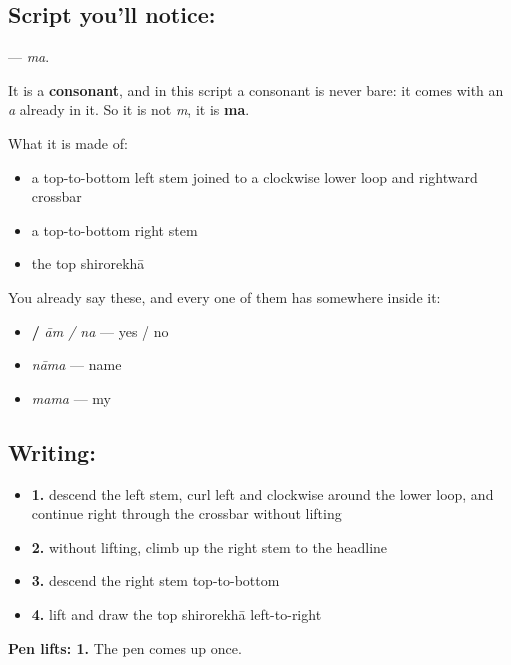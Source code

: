\subsection*{Script you'll notice: }
\textbf{} — \emph{ma}.

It is a \textbf{consonant}, and in this script a consonant is never bare: it comes with an \emph{a} already in it. So it is not \emph{m}, it is \textbf{ma}.

What it is made of:

\begin{itemize}
\raggedright
  \item a top-to-bottom left stem joined to a clockwise lower loop and rightward crossbar
  \item a top-to-bottom right stem
  \item the top shirorekhā
\end{itemize}

You already say these, and every one of them has  somewhere inside it:

\begin{itemize}
\raggedright
  \item \textbf{ / } \emph{ām / na} — yes / no
  \item \textbf{} \emph{nāma} — name
  \item \textbf{} \emph{mama} — my
\end{itemize}

\subsection*{Writing: }

\begin{itemize}
\raggedright
  \item \textbf{1.} descend the left stem, curl left and clockwise around the lower loop, and continue right through the crossbar without lifting
  \item \textbf{2.} without lifting, climb up the right stem to the headline
  \item \textbf{3.} descend the right stem top-to-bottom
  \item \textbf{4.} lift and draw the top shirorekhā left-to-right
\end{itemize}

\textbf{Pen lifts: 1.} The pen comes up once.

